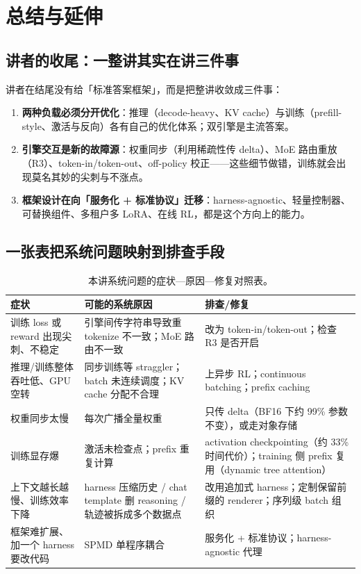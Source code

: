 \documentclass[a4paper]{article}
\begin{document}
\section{总结与延伸}

\subsection{讲者的收尾：一整讲其实在讲三件事}

讲者在结尾没有给「标准答案框架」，而是把整讲收敛成三件事：

\begin{enumerate}
\item \textbf{两种负载必须分开优化}：推理（decode-heavy、KV cache）与训练（prefill-style、激活与反向）各有自己的优化体系；双引擎是主流答案。
\item \textbf{引擎交互是新的故障源}：权重同步（利用稀疏性传 delta）、MoE 路由重放（R3）、token-in/token-out、off-policy 校正——这些细节做错，训练就会出现莫名其妙的尖刺与不涨点。
\item \textbf{框架设计在向「服务化 + 标准协议」迁移}：harness-agnostic、轻量控制器、可替换组件、多租户多 LoRA、在线 RL，都是这个方向上的能力。
\end{enumerate}

\subsection{一张表把系统问题映射到排查手段}

\begin{table}[H]
\centering
\small
\begin{tabular}{@{}p{}p{}p{}@{}}
\toprule
\textbf{症状} & \textbf{可能的系统原因} & \textbf{排查/修复} \\
\midrule
训练 loss 或 reward 出现尖刺、不稳定 & 引擎间传字符串导致重 tokenize 不一致；MoE 路由不一致 & 改为 token-in/token-out；检查 R3 是否开启 \\
推理/训练整体吞吐低、GPU 空转 & 同步训练等 straggler；batch 未连续调度；KV cache 分配不合理 & 上异步 RL；continuous batching；prefix caching \\
权重同步太慢 & 每次广播全量权重 & 只传 delta（BF16 下约 99\% 参数不变），或走对象存储 \\
训练显存爆 & 激活未检查点；prefix 重复计算 & activation checkpointing（约 33\% 时间代价）；training 侧 prefix 复用（dynamic tree attention） \\
上下文越长越慢、训练效率下降 & harness 压缩历史 / chat template 删 reasoning / 轨迹被拆成多个数据点 & 改用追加式 harness；定制保留前缀的 renderer；序列级 batch 组织 \\
框架难扩展、加一个 harness 要改代码 & SPMD 单程序耦合 & 服务化 + 标准协议；harness-agnostic 代理 \\
\bottomrule
\end{tabular}
\caption{本讲系统问题的症状—原因—修复对照表。}
\end{table}
\end{document}
